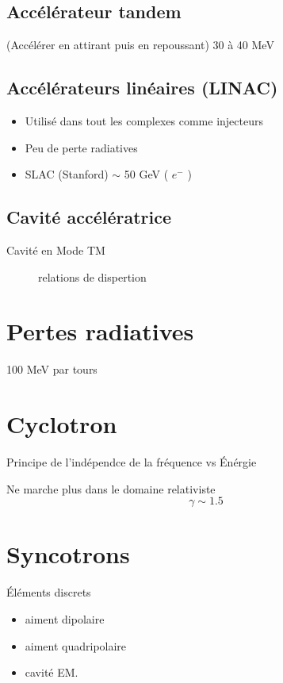 \subsection*{Accélérateur tandem}
 (Accélérer en attirant puis en repoussant)
30 à 40 MeV


\subsection*{Accélérateurs linéaires (LINAC)}

\begin{itemize}
	\item Utilisé dans tout les complexes comme injecteurs
	\item Peu de perte radiatives
	\item SLAC (Stanford) $\sim$ 50 GeV ( $e^-$  )  
\end{itemize}

\subsection*{Cavité accélératrice}

Cavité en Mode TM

\begin{figure}[ht]
    \centering
    \caption{relations de dispertion}
    \label{fig:relations-de-dispertion}
\end{figure}

\section*{Pertes radiatives}
100 MeV par tours


\section*{Cyclotron}

Principe de l'indépendce de la fréquence vs Énérgie

Ne marche plus dans le domaine relativiste
$$\gamma \sim 1.5$$ 


\section*{Syncotrons}

Éléments discrets
\begin{itemize}
	\item aiment dipolaire
	\item aiment quadripolaire
	\item cavité EM.
\end{itemize}

